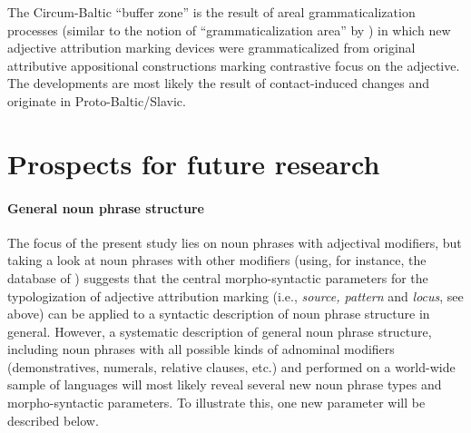 The Circum-Baltic “buffer zone” is the result of areal grammaticalization processes (similar to the notion of “grammaticalization area” by \citealt{heine-etal2005}) in which new adjective attribution marking devices were grammaticalized from original attributive appositional constructions marking contrastive focus on the adjective. The developments are most likely the result of contact-induced changes and originate in Proto\hyp{}Baltic\slash{}Slavic.

\newpage 
\section{Prospects for future research}
\paragraph*{General noun phrase structure} The focus of the present study lies on noun phrases with adjectival modifiers, but taking a look at noun phrases with other modifiers (using, for instance, the  database of \citealt{AUTOTYP-NP}) suggests that the central morpho-syntactic parameters for the typologization of adjective attribution marking (i.e., \textit{source, pattern} and \textit{locus}, see above) can be applied to a syntactic description of noun phrase structure in general. However, a systematic description of general noun phrase structure, including noun phrases with all possible kinds of adnominal modifiers (demonstratives, numerals, relative clauses, etc.) and performed on a world-wide sample of languages will most likely reveal several new noun phrase types and morpho\hyp{}syntactic parameters. To illustrate this, one new parameter will be described below.   


